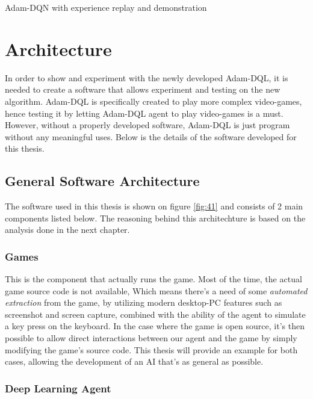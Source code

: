\begin{algorithm}[H]
{                }
                

            \caption{Adam-DQN with experience replay and demonstration}
            \end{algorithm}
    \section{Architecture}
    In order to show and experiment with the newly developed Adam-DQL, it is needed to create a software that allows experiment and testing on the new algorithm. Adam-DQL is specifically created to play more complex video-games, hence testing it by letting Adam-DQL agent to play video-games is a must. However, without a properly developed software, Adam-DQL is just program without any meaningful uses. Below is the details of the software developed for this thesis.
    \subsection{General Software Architecture}
    
    The software used in this thesis is shown on figure \ref{fig:41} and consists of 2 main components listed below. The reasoning behind this architechture is based on the analysis done in the next chapter. 
        \subsubsection{Games}
        This is the component that actually runs the game. Most of the time, the actual game source code is not available, Which means there's a need of some \textit{automated extraction} from the game, by utilizing modern desktop-PC features such as screenshot and screen capture, combined with the ability of the agent to simulate a key press on the keyboard. In the case where the game is open source, it's then possible to allow direct interactions between our agent and the game by simply modifying the game's source code. This thesis will provide an example for both cases, allowing the development of an AI that's as general as possible.
    
        \subsubsection{Deep Learning Agent}
        
